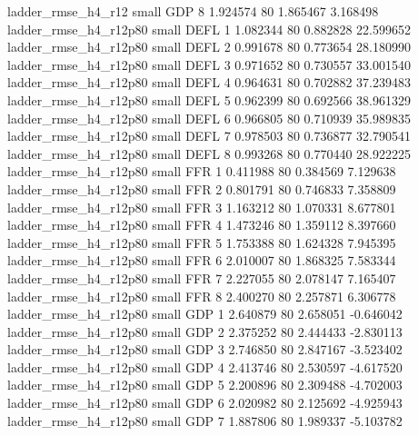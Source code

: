       ladder_rmse_h4_r12      small      GDP                 8 1.924574 80       1.865467           3.168498
   ladder_rmse_h4_r12p80      small     DEFL                 1 1.082344 80       0.882828          22.599652
   ladder_rmse_h4_r12p80      small     DEFL                 2 0.991678 80       0.773654          28.180990
   ladder_rmse_h4_r12p80      small     DEFL                 3 0.971652 80       0.730557          33.001540
   ladder_rmse_h4_r12p80      small     DEFL                 4 0.964631 80       0.702882          37.239483
   ladder_rmse_h4_r12p80      small     DEFL                 5 0.962399 80       0.692566          38.961329
   ladder_rmse_h4_r12p80      small     DEFL                 6 0.966805 80       0.710939          35.989835
   ladder_rmse_h4_r12p80      small     DEFL                 7 0.978503 80       0.736877          32.790541
   ladder_rmse_h4_r12p80      small     DEFL                 8 0.993268 80       0.770440          28.922225
   ladder_rmse_h4_r12p80      small      FFR                 1 0.411988 80       0.384569           7.129638
   ladder_rmse_h4_r12p80      small      FFR                 2 0.801791 80       0.746833           7.358809
   ladder_rmse_h4_r12p80      small      FFR                 3 1.163212 80       1.070331           8.677801
   ladder_rmse_h4_r12p80      small      FFR                 4 1.473246 80       1.359112           8.397660
   ladder_rmse_h4_r12p80      small      FFR                 5 1.753388 80       1.624328           7.945395
   ladder_rmse_h4_r12p80      small      FFR                 6 2.010007 80       1.868325           7.583344
   ladder_rmse_h4_r12p80      small      FFR                 7 2.227055 80       2.078147           7.165407
   ladder_rmse_h4_r12p80      small      FFR                 8 2.400270 80       2.257871           6.306778
   ladder_rmse_h4_r12p80      small      GDP                 1 2.640879 80       2.658051          -0.646042
   ladder_rmse_h4_r12p80      small      GDP                 2 2.375252 80       2.444433          -2.830113
   ladder_rmse_h4_r12p80      small      GDP                 3 2.746850 80       2.847167          -3.523402
   ladder_rmse_h4_r12p80      small      GDP                 4 2.413746 80       2.530597          -4.617520
   ladder_rmse_h4_r12p80      small      GDP                 5 2.200896 80       2.309488          -4.702003
   ladder_rmse_h4_r12p80      small      GDP                 6 2.020982 80       2.125692          -4.925943
   ladder_rmse_h4_r12p80      small      GDP                 7 1.887806 80       1.989337          -5.103782
